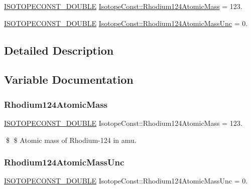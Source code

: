 \begin{DoxyCompactItemize}
\item 
\mbox{\hyperlink{group___isotope_const-_macros_ga8f45a7272ce02c0b4c65c44636ed719a}{I\+S\+O\+T\+O\+P\+E\+C\+O\+N\+S\+T\+\_\+\+D\+O\+U\+B\+LE}} \mbox{\hyperlink{group___isotope_const-_rhodium-_rh124_ga6a1bb57d725538b0d8647c4b939ad574}{Isotope\+Const\+::\+Rhodium124\+Atomic\+Mass}} = 123.
\item 
\mbox{\hyperlink{group___isotope_const-_macros_ga8f45a7272ce02c0b4c65c44636ed719a}{I\+S\+O\+T\+O\+P\+E\+C\+O\+N\+S\+T\+\_\+\+D\+O\+U\+B\+LE}} \mbox{\hyperlink{group___isotope_const-_rhodium-_rh124_ga7aba7e83aa48aa10a472161a350508d2}{Isotope\+Const\+::\+Rhodium124\+Atomic\+Mass\+Unc}} = 0.
\end{DoxyCompactItemize}


\subsection{Detailed Description}


\subsection{Variable Documentation}
\mbox{\label{group___isotope_const-_rhodium-_rh124_ga6a1bb57d725538b0d8647c4b939ad574}} 
\subsubsection{\texorpdfstring{Rhodium124\+Atomic\+Mass}{Rhodium124AtomicMass}}
{\footnotesize\ttfamily \mbox{\hyperlink{group___isotope_const-_macros_ga8f45a7272ce02c0b4c65c44636ed719a}{I\+S\+O\+T\+O\+P\+E\+C\+O\+N\+S\+T\+\_\+\+D\+O\+U\+B\+LE}} Isotope\+Const\+::\+Rhodium124\+Atomic\+Mass = 123.}

\$ \$ Atomic mass of Rhodium-\/124 in amu. \mbox{\label{group___isotope_const-_rhodium-_rh124_ga7aba7e83aa48aa10a472161a350508d2}} 
\subsubsection{\texorpdfstring{Rhodium124\+Atomic\+Mass\+Unc}{Rhodium124AtomicMassUnc}}
{\footnotesize\ttfamily \mbox{\hyperlink{group___isotope_const-_macros_ga8f45a7272ce02c0b4c65c44636ed719a}{I\+S\+O\+T\+O\+P\+E\+C\+O\+N\+S\+T\+\_\+\+D\+O\+U\+B\+LE}} Isotope\+Const\+::\+Rhodium124\+Atomic\+Mass\+Unc = 0.}

